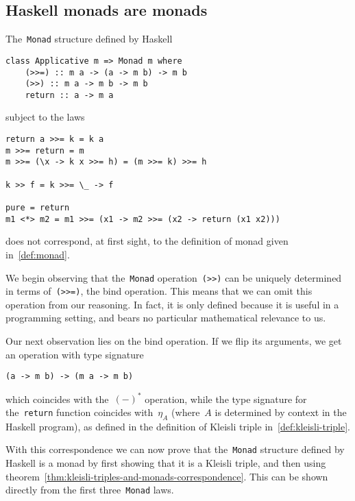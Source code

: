 \documentclass[a4paper]{article}
\theoremstyle{plain}
\theoremstyle{definition}
\begin{document}
\subsection{Haskell monads are monads}
The~\texttt{Monad} structure defined by Haskell
\begin{verbatim}
class Applicative m => Monad m where
    (>>=) :: m a -> (a -> m b) -> m b
    (>>) :: m a -> m b -> m b
    return :: a -> m a
\end{verbatim}
subject to the laws
\begin{verbatim}
return a >>= k = k a
m >>= return = m
m >>= (\x -> k x >>= h) = (m >>= k) >>= h

k >> f = k >>= \_ -> f

pure = return
m1 <*> m2 = m1 >>= (x1 -> m2 >>= (x2 -> return (x1 x2)))
\end{verbatim}
does not correspond, at first sight, to the definition of monad given
in~\ref{def:monad}.

We begin observing that the~\texttt{Monad}
operation~\texttt{(>>)} can be uniquely determined in terms
of~\texttt{(>>=)}, the bind operation.
This means that we can omit this operation from our reasoning. In fact, it is
only defined because it is useful in a programming setting, and bears no
particular mathematical relevance to us.

Our next observation lies on the bind operation. If we flip its arguments, we
get an operation with type signature
\begin{verbatim}
(a -> m b) -> (m a -> m b)
\end{verbatim}
which coincides with the~\((-)^{\ast}\) operation, while the type signature for
the~\texttt{return} function coincides with~\(\eta_{A}\)
(where~\(A\) is determined by context in the Haskell program), as defined in the
definition of Kleisli triple in~\ref{def:kleisli-triple}.

With this correspondence we can now prove that the~\texttt{Monad}
structure defined by Haskell is a monad by first showing that it is a Kleisli
triple, and then using
theorem~\ref{thm:kleisli-triples-and-monads-correspondence}. This can be shown
directly from the first three~\texttt{Monad} laws.

\printbibliography
\end{document}
